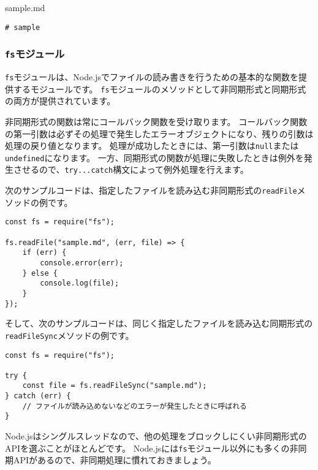 \begin{listtitle}
sample.md
\end{listtitle}
\begin{lstlisting}
# sample
\end{lstlisting}
\listend

\hypertarget{fs-module}{%
\subsubsection{\texorpdfstring{\texttt{fs}モジュール}{fsモジュール}}\label{fs-module}}

\texttt{fs}モジュールは、Node.jsでファイルの読み書きを行うための基本的な関数を提供するモジュールです。
\texttt{fs}モジュールのメソッドとして非同期形式と同期形式の両方が提供されています。

非同期形式の関数は常にコールバック関数を受け取ります。
コールバック関数の第一引数は必ずその処理で発生したエラーオブジェクトになり、残りの引数は処理の戻り値となります。
処理が成功したときには、第一引数は\texttt{null}または\texttt{undefined}になります。
一方、同期形式の関数が処理に失敗したときは例外を発生させるので、\texttt{try...catch}構文によって例外処理を行えます。

次のサンプルコードは、指定したファイルを読み込む非同期形式の\texttt{readFile}メソッドの例です。

\begin{lstlisting}
const fs = require("fs");

fs.readFile("sample.md", (err, file) => {
    if (err) {
        console.error(err);
    } else {
        console.log(file);
    }
});
\end{lstlisting}

そして、次のサンプルコードは、同じく指定したファイルを読み込む同期形式の\texttt{readFileSync}メソッドの例です。

\begin{lstlisting}
const fs = require("fs");

try {
    const file = fs.readFileSync("sample.md");
} catch (err) { 
    // ファイルが読み込めないなどのエラーが発生したときに呼ばれる
}
\end{lstlisting}

Node.jsはシングルスレッドなので、他の処理をブロックしにくい非同期形式のAPIを選ぶことがほとんどです。
Node.jsには\texttt{fs}モジュール以外にも多くの非同期APIがあるので、非同期処理に慣れておきましょう。


